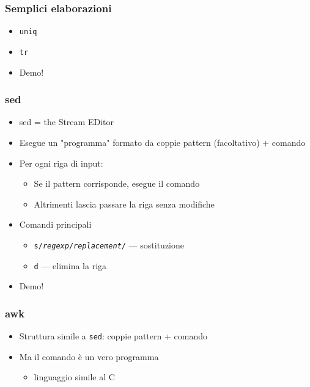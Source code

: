 \documentclass[xetex,table]{beamer}
\begin{document}
\begin{frame}
  \frametitle{Semplici elaborazioni}
  \begin{itemize}
  \item \texttt{uniq}
  \item \texttt{tr}
  \item Demo!
  \end{itemize}
\end{frame}

\begin{frame}
  \frametitle{sed}
  \begin{itemize}
  \item sed = the Stream EDitor
  \item Esegue un "programma" formato da coppie pattern (facoltativo)
    + comando
  \item Per ogni riga di input:
    \begin{itemize}
    \item Se il pattern corrisponde, esegue il comando
    \item Altrimenti lascia passare la riga senza modifiche
    \end{itemize}
  \item Comandi principali
    \begin{itemize}
    \item \texttt{s/\emph{regexp}/\emph{replacement}/} --- sostituzione
    \item \texttt{d} --- elimina la riga
    \end{itemize}
  \item Demo!
  \end{itemize}
\end{frame}

\begin{frame}
  \frametitle{awk}
  \begin{itemize}
  \item Struttura simile a \texttt{sed}: coppie pattern + comando
  \item Ma il comando è un vero programma
    \begin{itemize}
    \item linguaggio simile al C
    \end{itemize}
  \end{itemize}
\end{frame}
\end{document}
